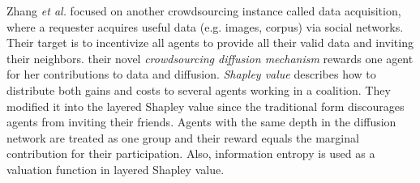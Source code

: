 \documentclass{article}
\begin{document}
Zhang \emph{et al.}  focused on another crowdsourcing instance called data acquisition, where a requester acquires useful data (e.g. images, corpus) via social networks. Their target is to incentivize all agents to provide all their valid data and inviting their neighbors. their novel \textit{crowdsourcing diffusion mechanism} rewards one agent for her contributions to data and diffusion. \textit{Shapley value} describes how to distribute both gains and costs to several agents working in a coalition\cite{roth1988shapley}. They modified it into the layered Shapley value since the traditional form discourages agents from inviting their friends. Agents with the same depth in the diffusion network are treated as one group and their reward equals the marginal contribution for their participation. Also, information entropy\cite{shannon1948mathematical} is used as a valuation function in layered Shapley value.
\end{document}
